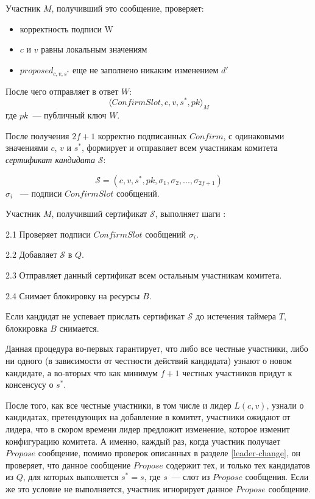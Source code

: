 \noindent Участник $M$, получивший это сообщение, проверяет:
\begin{itemize}
\item корректность подписи W
\item $c$ и $v$ равны локальным значениям
\item $proposed_{c, v, s^{*}}$ еще не заполнено никаким изменением $d'$
\end{itemize} 
После чего отправляет в ответ $W$:
 \[ \langle ConfirmSlot, c, v, s^{*}, pk \rangle_M \]
где $pk$~--- публичный ключ $W$.
\vspace{10pt}

После получения $2f+1$ корректно подписанных $Confirm$, с одинаковыми значениями $c$, $v$ и $s^{*}$,
формирует и отправляет всем участникам комитета \textit{сертификат кандидата} $\mathcal{S}$:

$$\mathcal{S}=(c, v, s^{*}, pk, \sigma_1, \sigma_2,..., \sigma_{2f+1})$$
$\sigma_i$ ~--- подписи $ConfirmSlot$ сообщений.
\vspace{10pt}

Участник $M$, получивший сертификат $\mathcal{S}$, выполняет шаги : 

2.1 Проверяет подписи $ConfirmSlot$ сообщений $\sigma_i$.

2.2 Добавляет $\mathcal{S}$ в $Q$.

2.3 Отправляет данный сертификат всем остальным участникам комитета.

2.4 Снимает блокировку на ресурсы $B$.

Если кандидат не успевает прислать сертификат $\mathcal{S}$ до истечения таймера $T$, блокировка $B$ снимается.

Данная процедура во-первых гарантирует, что либо все честные участники, либо ни одного (в зависимости от честности действий кандидата) узнают о новом кандидате, а во-вторых что как минимум $f+1$ честных участников придут к консенсусу о $s^{*}$.

После того, как все честные участники, в том числе и лидер $L(c, v)$, узнали о кандидатах, претендующих на добавление в комитет, участники ожидают от лидера, что в скором времени лидер предложит изменение, которое изменит конфигурацию комитета. А именно, каждый раз, когда участник получает $Propose$ сообщение, помимо проверок описанных в  разделе \ref{leader-change}, он проверяет, что данное сообщение $Propose$ содержит тех, и только тех кандидатов из $Q$, для которых выполяется $s^{*} = s$, где $s$~--- слот из $Propose$ сообщения. Если же это условие не выполняется, участник игнорирует данное $Propose$ сообщение.


